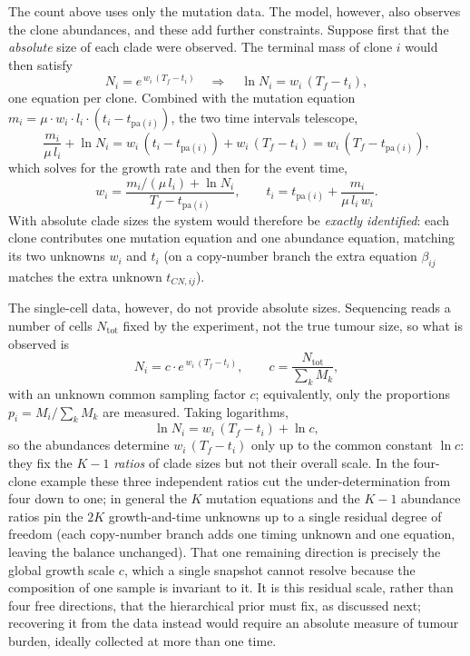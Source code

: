 The count above uses only the mutation data. The model, however, also observes the
clone abundances, and these add further constraints. Suppose first that the
\emph{absolute} size of each clade were observed. The terminal mass of clone $i$
would then satisfy
%
\begin{equation}
    N_i = e^{\,w_i\,(T_f - t_i)}
    \quad\Longrightarrow\quad
    \ln N_i = w_i\,(T_f - t_i),
\end{equation}
%
one equation per clone. Combined with the mutation equation
$m_i = \mu \cdot w_i \cdot l_i \cdot (t_i - t_{\mathrm{pa}(i)})$, the two time
intervals telescope,
%
\begin{equation}
    \frac{m_i}{\mu\,l_i} + \ln N_i
    = w_i\,(t_i - t_{\mathrm{pa}(i)}) + w_i\,(T_f - t_i)
    = w_i\,(T_f - t_{\mathrm{pa}(i)}),
\end{equation}
%
which solves for the growth rate and then for the event time,
%
\begin{equation}
    w_i = \frac{m_i/(\mu\,l_i) + \ln N_i}{T_f - t_{\mathrm{pa}(i)}},
    \qquad
    t_i = t_{\mathrm{pa}(i)} + \frac{m_i}{\mu\,l_i\,w_i}.
\end{equation}
%
With absolute clade sizes the system would therefore be \emph{exactly identified}:
each clone contributes one mutation equation and one abundance equation, matching its
two unknowns $w_i$ and $t_i$ (on a copy-number branch the extra equation $\beta_{ij}$
matches the extra unknown $t_{CN,ij}$).

The single-cell data, however, do not provide absolute sizes. Sequencing reads a
number of cells $N_{\mathrm{tot}}$ fixed by the experiment, not the true tumour size,
so what is observed is
%
\begin{equation}
    N_i = c \cdot e^{\,w_i\,(T_f - t_i)},
    \qquad
    c = \frac{N_{\mathrm{tot}}}{\sum_k M_k},
\end{equation}
%
with an unknown common sampling factor $c$; equivalently, only the proportions
$p_i = M_i / \sum_k M_k$ are measured. Taking logarithms,
%
\begin{equation}
    \ln N_i = w_i\,(T_f - t_i) + \ln c,
\end{equation}
%
so the abundances determine $w_i\,(T_f - t_i)$ only up to the common constant
$\ln c$: they fix the $K-1$ \emph{ratios} of clade sizes but not their overall scale.
In the four-clone example these three independent ratios cut the under-determination
from four down to one; in general the $K$ mutation equations and the $K-1$ abundance
ratios pin the $2K$ growth-and-time unknowns up to a single residual degree of freedom
(each copy-number branch adds one timing unknown and one equation, leaving the balance
unchanged). That one remaining direction is precisely the global growth scale $c$,
which a single snapshot cannot resolve because the composition of one sample is
invariant to it. It is this residual scale, rather than four free directions, that the
hierarchical prior must fix, as discussed next; recovering it from the data instead
would require an absolute measure of tumour burden, ideally collected at more than one
time.

